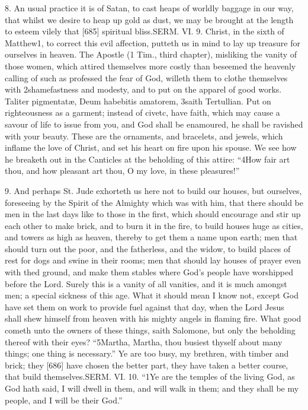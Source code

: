 8. An usual practice it is of Satan, to cast heaps of worldly baggage in our way, that whilst we desire to heap up gold as dust, we may be brought at the length to esteem vilely that [685] spiritual bliss.SERM. VI. 9. Christ, in the sixth of Matthew1, to correct this evil affection, putteth us in mind to lay up treasure for ourselves in heaven. The Apostle (1 Tim., third chapter), misliking the vanity of those women, which attired themselves more costly than beseemed the heavenly calling of such as professed the fear of God, willeth them to clothe themselves with 2shamefastness and modesty, and to put on the apparel of good works. Taliter pigmentatæ, Deum habebitis amatorem, 3saith Tertullian. Put on righteousness as a garment; instead of civetc, have faith, which may cause a savour of life to issue from you, and God shall be enamoured, he shall be ravished with your beauty. These are the ornaments, and bracelets, and jewels, which inflame the love of Christ, and set his heart on fire upon his spouse. We see how he breaketh out in the Canticles at the beholding of this attire: “4How fair art thou, and how pleasant art thou, O my love, in these pleasures!”

9. And perhaps St. Jude exhorteth us here not to build our houses, but ourselves, foreseeing by the Spirit of the Almighty which was with him, that there should be men in the last days like to those in the first, which should encourage and stir up each other to make brick, and to burn it in the fire, to build houses huge as cities, and towers as high as heaven, thereby to get them a name upon earth; men that should turn out the poor, and the fatherless, and the widow, to build places of rest for dogs and swine in their rooms; men that should lay houses of prayer even with thed ground, and make them stables where God’s people have worshipped before the Lord. Surely this is a vanity of all vanities, and it is much amongst men; a special sickness of this age. What it should mean I know not, except God have set them on work to provide fuel against that day, when the Lord Jesus shall shew himself from heaven with his mighty angels in flaming fire. What good cometh unto the owners of these things, saith Salomone, but only the beholding thereof with their eyes? “5Martha, Martha, thou busiest thyself about many things; one thing is necessary.” Ye are too busy, my brethren, with timber and brick; they [686] have chosen the better part, they have taken a better course, that build themselves.SERM. VI. 10. “1Ye are the temples of the living God, as God hath said, I will dwell in them, and will walk in them; and they shall be my people, and I will be their God.”

